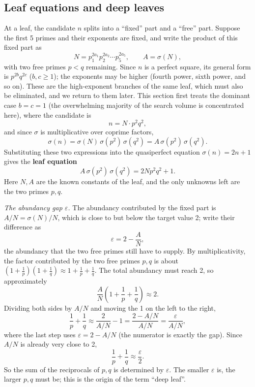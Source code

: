 \documentclass[11pt]{article}
\theoremstyle{remark}
\begin{document}
\subsection{Leaf equations and deep leaves}\label{sec:leafeq}

At a leaf, the candidate $n$ splits into a ``fixed'' part and a ``free'' part. Suppose the first 5 primes and their exponents are fixed, and write the product of this fixed part as
\[ N = p_1^{2a_1} p_2^{2a_2} \cdots p_5^{2a_5}, \qquad A = \sigma(N),
\] with two free primes $p < q$ remaining. Since $n$ is a perfect square, its general form is $p^{2b} q^{2c}$ ($b, c \ge 1$); the exponents may be higher (fourth power, sixth power, and so on). These are the high-exponent branches of the same leaf, which must also be eliminated, and we return to them later. This section first treats the dominant case $b = c = 1$ (the overwhelming majority of the search volume is concentrated here), where the candidate is
\[ n = N \cdot p^2 q^2,
\] and since $\sigma$ is multiplicative over coprime factors,
\[ \sigma(n) = \sigma(N)\,\sigma(p^2)\,\sigma(q^2) = A\,\sigma(p^2)\,\sigma(q^2).
\] Substituting these two expressions into the quasiperfect equation $\sigma(n) = 2n + 1$ gives the \textbf{leaf equation}
\begin{equation} A\,\sigma(p^2)\,\sigma(q^2) = 2Np^2q^2 + 1. \label{eq:leaf}
\end{equation} Here $N, A$ are the known constants of the leaf, and the only unknowns left are the two primes $p, q$.

\emph{The abundancy gap $\varepsilon$.} The abundancy contributed by the fixed part is $A/N = \sigma(N)/N$, which is close to but below the target value 2; write their difference as
\[ \varepsilon = 2 - \frac{A}{N},
\] the abundancy that the two free primes still have to supply. By multiplicativity, the factor contributed by the two free primes $p, q$ is about $\left(1 + \frac1p\right)\left(1 + \frac1q\right) \approx 1 + \frac1p + \frac1q$. The total abundancy must reach 2, so approximately
\[ \frac{A}{N}\left(1 + \frac1p + \frac1q\right) \approx 2.
\] Dividing both sides by $A/N$ and moving the 1 on the left to the right,
\[ \frac1p + \frac1q \approx \frac{2}{A/N} - 1 = \frac{2 - A/N}{A/N} = \frac{\varepsilon}{A/N},
\] where the last step uses $\varepsilon = 2 - A/N$ (the numerator is exactly the gap). Since $A/N$ is already very close to 2,
\[ \frac1p + \frac1q \approx \frac{\varepsilon}{2}.
\] So the sum of the reciprocals of $p, q$ is determined by $\varepsilon$. The smaller $\varepsilon$ is, the larger $p, q$ must be; this is the origin of the term ``deep leaf''.
\end{document}
